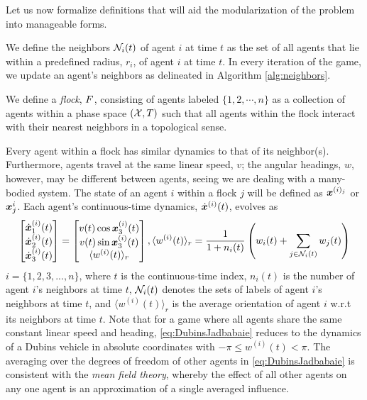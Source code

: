 Let us now formalize definitions that will aid the modularization of the problem into manageable forms.
%

\begin{definition}
	We define the neighbors $\mathcal{N}_i(t)$ of agent $i$ at time $t$ as the set of all agents that lie within a predefined radius, $r_i$, of agent $i$ at time $t$. In every iteration of the game, we update an agent's neighbors as delineated in Algorithm \ref{alg:neighbors}.
\end{definition}
%
\begin{definition}
	We define a \textit{flock}, $F$, consisting of agents labeled $\{1, 2, \cdots, n\}$  as a collection of agents within a phase space $(\mathcal{X}, T)$ such that all agents within the flock interact with their nearest neighbors in a topological sense.
	\label{def:flock}
\end{definition}
%
\begin{remark}
	Every agent within a flock has similar dynamics to that of its neighbor(s). Furthermore, agents travel at the same linear speed, $v$; the angular headings, $w$, however, may be different between agents, seeing we are dealing with a many-bodied system. The state of an agent $i$ within a flock $j$ will be defined as $\bm{x}^{(i)_j}$ or $\bm{x}^i_j$. Each agent's continuous-time dynamics, $\dot{\bm{x}}^{(i)}(t)$, evolves as
	\begin{align}
	\begin{bmatrix}
		 \dot{\bm{x}}^{(i)}_1(t) \\ \dot{\bm{x}}^{(i)}_2 (t) \\ \dot{\bm{x}}^{(i)}_3 (t)
		\end{bmatrix} 
		= \begin{bmatrix}
			v(t) \cos \bm{x}_3^{(i)}(t) \\ v(t)\sin \bm{x}_3^{(i)}(t) \\ \langle w^{(i)}(t) \rangle_r
		\end{bmatrix},
		 \langle w^{(i)}(t) \rangle_r = \dfrac{1}{1+n_i(t)}\left(w_i(t) + \sum_{j \in \mathcal{N}_i(t)}^{} w_j(t)\right) 
		\label{eq:DubinsJadbabaie}
	\end{align}
	 $i = \{1, 2, 3, ..., n\}$, where $t$ is the continuous-time index, $n_i(t)$ is the number of agent $i$'s neighbors at time $t$, $\mathcal{N}_i(t)$ denotes the sets of labels of  agent $i$'s neighbors at time $t$, and $\langle w^{(i)}(t) \rangle_r$ is the average orientation of agent $i$ w.r.t its neighbors at time $t$. Note that for a game where all agents share the same constant linear speed and heading, \eqref{eq:DubinsJadbabaie} reduces to the dynamics of a Dubins vehicle in absolute coordinates with $-\pi \le w^{(i)}(t) < \pi$. The averaging over the degrees of freedom of other agents in \eqref{eq:DubinsJadbabaie} is consistent with the \textit{mean field theory}, whereby the effect of all other agents on any one agent is an approximation of a single averaged influence.
\end{remark}


